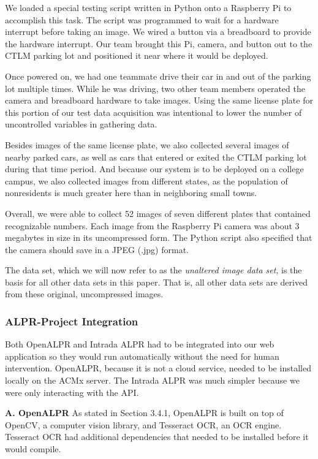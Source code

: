 \documentclass[11pt, oneside, fullpage, doublespace]{article}
\begin{document}
We loaded a special testing script written in Python onto a Raspberry Pi to accomplish this task. The script was programmed to wait for a hardware interrupt before taking an image. We wired a button via a breadboard to provide the hardware interrupt. Our team brought this Pi, camera, and button out to the CTLM parking lot and positioned it near where it would be deployed.

Once powered on, we had one teammate drive their car in and out of the parking lot multiple times. While he was driving, two other team members operated the camera and breadboard hardware to take images. Using the same license plate for this portion of our test data acquisition was intentional to lower the number of uncontrolled variables in gathering data.

Besides images of the same license plate, we also collected several images of nearby parked cars, as well as cars that entered or exited the CTLM parking lot during that time period. And because our system is to be deployed on a college campus, we also collected images from different states, as the population of nonresidents is much greater here than in neighboring small towns.

Overall, we were able to collect 52 images of seven different plates that contained recognizable numbers. Each image from the Raspberry Pi camera was about 3 megabytes in size in its uncompressed form. The Python script also specified that the camera should save in a JPEG (.jpg) format.

The data set, which we will now refer to as the \emph{unaltered image data set}, is the basis for all other data sets in this paper. That is, all other data sets are derived from these original, uncompressed images. 

\subsubsection{ALPR-Project Integration}
Both OpenALPR and Intrada ALPR had to be integrated into our web application so they would run automatically without the need for human intervention. OpenALPR, because it is not a cloud service, needed to be installed locally on the ACMx server. The Intrada ALPR was much simpler because we were only interacting with the API.

\textbf{A. OpenALPR}
As stated in Section 3.4.1, OpenALPR is built on top of OpenCV, a computer vision library, and Tesseract OCR, an OCR engine. Tesseract OCR had additional dependencies that needed to be installed before it would compile.
\end{document}
